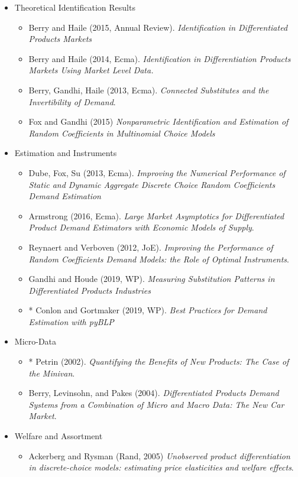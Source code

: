\documentclass[11pt]{article}
\begin{document}
\begin{itemize}
\item Theoretical Identification Results
\begin{itemize}
\item Berry and Haile (2015, Annual Review). \textit{Identification in Differentiated Products Markets}
\item Berry and Haile (2014, Ecma). \textit{Identification in Differentiation Products Markets Using Market Level Data.}
\item Berry, Gandhi, Haile (2013, Ecma). \textit{Connected Substitutes and the Invertibility of Demand}.
\item Fox and Gandhi (2015) \textit{Nonparametric Identification and Estimation of Random Coefficients in Multinomial Choice Models}
\end{itemize}
\item Estimation and Instruments
\begin{itemize}
\item Dube, Fox, Su (2013, Ecma). \textit{Improving the Numerical Performance of Static and Dynamic Aggregate Discrete Choice Random Coefficients Demand Estimation}
\item Armstrong (2016, Ecma). \textit{Large Market Asymptotics for Differentiated Product Demand Estimators with Economic Models of Supply}.
\item Reynaert and Verboven (2012, JoE). \textit{Improving the Performance of Random Coefficients Demand Models: the Role of Optimal Instruments}.
\item Gandhi and Houde (2019, WP). \textit{Measuring Substitution Patterns in Differentiated Products Industries}
\item * Conlon and Gortmaker (2019, WP). \textit{Best Practices for Demand Estimation with pyBLP}
\end{itemize}
\item Micro-Data
\begin{itemize}
\item * Petrin (2002). \textit{Quantifying the Benefits of New Products: The Case of the Minivan}.
\item Berry, Levinsohn, and Pakes (2004). \textit{Differentiated Products Demand Systems from a Combination of Micro and Macro Data: The New Car Market}.
\end{itemize}
\item Welfare and Assortment
\begin{itemize}
\item Ackerberg and Rysman (Rand, 2005) \textit{Unobserved product differentiation in discrete-choice models: estimating price elasticities and welfare effects}.

\end{itemize}
\end{itemize}
\end{document}
